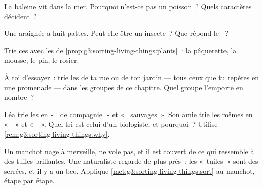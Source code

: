 \begin{exercise}[$\star$]\label{exo:g3:sorting-living-things:5}
La baleine vit dans la mer. Pourquoi n'est-ce pas un poisson~? Quels
caractères décident~?
\end{exercise}

\begin{exercise}[$\star$]\label{exo:g3:sorting-living-things:6}
Une araignée a huit pattes. Peut-elle être un insecte~? Que répond
le ~?
\end{exercise}

\begin{exercise}[$\star$]\label{exo:g3:sorting-living-things:7}
Trie ces  avec les  de
\cref{prop:g3:sorting-living-things:plants}~: la pâquerette, la
mousse, le pin, le rosier.
\end{exercise}

\begin{exercise}[$\star$]\label{exo:g3:sorting-living-things:8}
À toi d'essayer~: trie les  de ta rue ou de ton jardin ---
tous ceux que tu repères en une promenade --- dans les groupes de ce
chapitre. Quel groupe l'emporte en nombre~?
\end{exercise}

\begin{exercise}[$\star\star$]\label{exo:g3:sorting-living-things:9}
Léa trie les  en «~ de compagnie~» et «~
sauvages~». Son amie trie les mêmes  en «~~» et
«~~». Quel tri est celui d'un biologiste, et pourquoi~?
Utilise \cref{rem:g3:sorting-living-things:why}.
\end{exercise}

\begin{exercise}[$\star\star$]\label{exo:g3:sorting-living-things:10}
Un manchot nage à merveille, ne vole pas, et il est couvert de ce
qui ressemble à des tuiles brillantes. Une naturaliste regarde de
plus près~: les «~tuiles~» sont des  serrées, et il y a un
bec. Applique
\cref{met:g3:sorting-living-things:sort} au manchot, étape par
étape.
\end{exercise}
